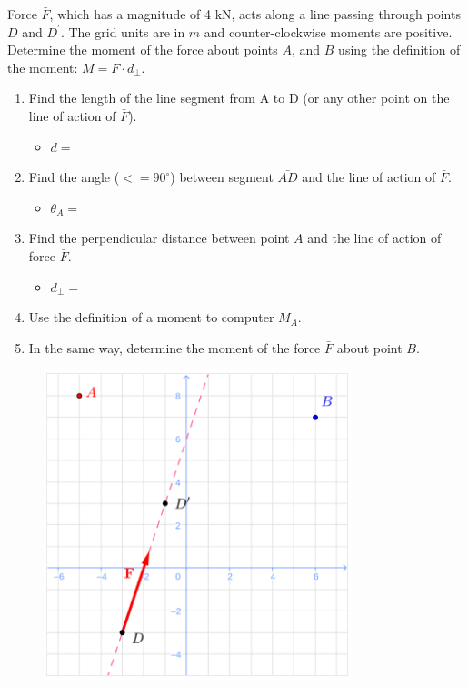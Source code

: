 
Force $\bar{F}$, which has a magnitude of 4 kN, acts along a line passing through points $D$ and $D^\prime$.   The grid units are in $m$ and counter-clockwise moments are positive.  Determine the moment of the force about points $A$, and $B$ using the definition of the moment: $M = F \cdot d_{\perp}$.

\begin{enumerate}
  \item Find the length of the line segment from A to D (or any other point on the line of action of $\bar{F}$).
  \begin{itemize}\item $d = $\end{itemize}
  \item Find the angle ($<= 90^\circ$) between segment $\bar{AD}$ and the line of action of $\bar{F}$.
  \begin{itemize}\item$\theta_A = $\end{itemize}
  \item Find the perpendicular distance between point $A$ and the line of action of force $\bar{F}$.
  \begin{itemize}\item$d_{\perp} = $ \end{itemize}
  \item Use the definition of a moment to computer $M_A$.
  \item In the same way, determine the moment of the force $\bar{F}$ about point $B$.
\end{enumerate}

\begin{figure}[ht!]
  \centering
  \includegraphics[width=0.8\textwidth,height=0.3\textheight,keepaspectratio]{fig.png}
\end{figure}

